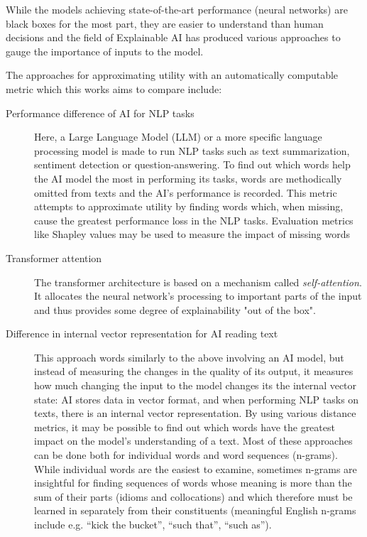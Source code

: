 

While the models achieving state-of-the-art performance (neural networks) are black boxes for the most part, they are easier to understand than human decisions and the field of Explainable AI has produced various approaches to gauge the importance of inputs to the model.


The approaches for approximating utility with an automatically computable metric which this works aims to compare include:

\begin{description}
	\item [Performance difference of AI for NLP tasks]
	      Here, a Large Language Model (LLM) or a more specific language processing model is made to run NLP tasks such as text summarization, sentiment detection or question-answering.
	      To find out which words help the AI model the most in performing its tasks, words are methodically omitted from texts and the AI’s performance is recorded.
	      This metric attempts to approximate utility by finding words which, when missing, cause the greatest performance loss in the NLP tasks.
	      Evaluation metrics like Shapley values \cite{wangShapleyExplanationNetworks2021} may be used to measure the impact of missing words
	\item [Transformer attention]
	      The transformer architecture is based on a mechanism called \textit{self-attention}.
	      It allocates the neural network's processing to important parts of the input and thus provides some degree of explainability "out of the box".

	\item [Difference in internal vector representation for AI reading text]
	      This approach words similarly to the above involving an AI model, but instead of measuring the changes in the quality of its output, it measures how much changing the input to the model changes its the internal vector state: AI stores data in vector format, and when performing NLP tasks on texts, there is an internal vector representation.
	      By using various distance metrics, it may be possible to find out which words have the greatest impact on the model’s understanding of a text.
	      Most of these approaches can be done both for individual words and word sequences (n-grams).
	      While individual words are the easiest to examine, sometimes n-grams are insightful for finding sequences of words whose meaning is more than the sum of their parts (idioms and collocations) and which therefore must be learned in separately from their constituents (meaningful English n-grams include e.g. “kick the bucket”, “such that”, “such as”).


\end{description}
